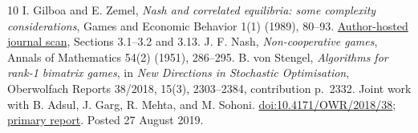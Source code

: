 \documentclass[11pt]{article}
\theoremstyle{remark}\newtheorem{remark}[theorem]{Remark}
\begin{document}
\begin{thebibliography}{10}
 I. Gilboa and E. Zemel, \emph{Nash and correlated equilibria: some complexity considerations}, Games and Economic Behavior 1(1) (1989), 80--93. \href{https://itzhakgilboa.weebly.com/uploads/8/3/6/3/8363317/gilboa_zemel_nash_complexity.pdf}{Author-hosted journal scan}, Sections 3.1--3.2 and 3.13.
 J. F. Nash, \emph{Non-cooperative games}, Annals of Mathematics 54(2) (1951), 286--295.
 B. von Stengel, \emph{Algorithms for rank-1 bimatrix games}, in \emph{New Directions in Stochastic Optimisation}, Oberwolfach Reports 38/2018, 15(3), 2303--2384, contribution p.~2332. Joint work with B. Adsul, J. Garg, R. Mehta, and M. Sohoni. \href{https://doi.org/10.4171/OWR/2018/38}{doi:10.4171/OWR/2018/38}; \href{https://ems.press/content/serial-article-files/46760}{primary report}. Posted 27 August 2019.
\end{thebibliography}
\end{document}
